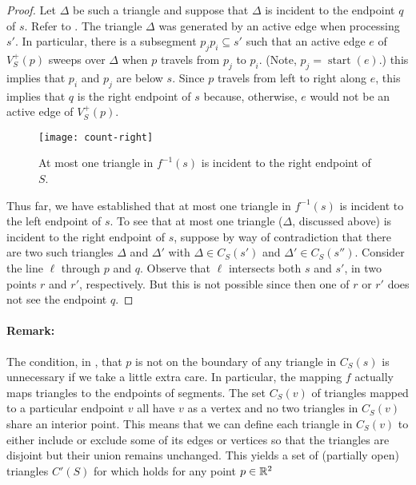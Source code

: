 \documentclass{patmorin}
\DeclareMathOperator{\start}{start}
\begin{document}
\begin{proof}
Let $\Delta$ be such a triangle and suppose that $\Delta$ is incident to
the endpoint $q$ of $s$.  Refer to .  The triangle
$\Delta$ was generated by an active edge when processing $s'$.  In
particular, there is a subsegment $p_j p_i\subseteq s'$ such that an active
edge $e$ of $V^+_S(p)$ sweeps over $\Delta$ when $p$ travels from $p_j$ to
$p_i$. (Note, $p_j=\start(e)$.) this implies that $p_i$ and $p_j$ are below
$s$. Since $p$ travels from left to right along $e$, this implies that $q$
is the right endpoint of $s$ because, otherwise, $e$ would not be an active
edge of $V^+_S(p)$.

\begin{figure}
  \begin{center}
    \texttt{[image: count-right]}
  \end{center}
  \caption{At most one triangle in $f^{-1}(s)$ is incident to the right
           endpoint of $S$.}
\end{figure}

Thus far, we have established that at most one triangle in $f^{-1}(s)$ is
incident to the left endpoint of $s$.  To see that at most one triangle
($\Delta$, discussed above) is incident to the right endpoint of $s$,
suppose by way of contradiction that there are two such triangles $\Delta$
and $\Delta'$ with $\Delta\in C_S(s')$ and $\Delta'\in C_S(s'')$.
Consider the line $\ell$ through $p$ and $q$.  Observe that $\ell$
intersects both $s$ and $s'$, in two points $r$ and $r'$, respectively. But
this is not possible since then one of $r$ or $r'$ does not see the
endpoint $q$.
\end{proof}

\paragraph{Remark:}
The condition, in , that $p$ is not on the boundary of
any triangle in $C_S(s)$ is unnecessary if we take a little extra care.
In particular, the mapping $f$ actually maps triangles to the endpoints of
segments.  The set $C_S(v)$ of triangles mapped to a particular endpoint
$v$ all have $v$ as a vertex and no two triangles in $C_S(v)$ share an
interior point.  This means that we can define each triangle in $C_S(v)$
to either include or exclude some of its edges or vertices so that the
triangles are disjoint but their union remains unchanged. This yields
a set of (partially open) triangles $C'(S)$ for which 
holds for any point $p\in\mathbb{R}^2$
\end{document}
